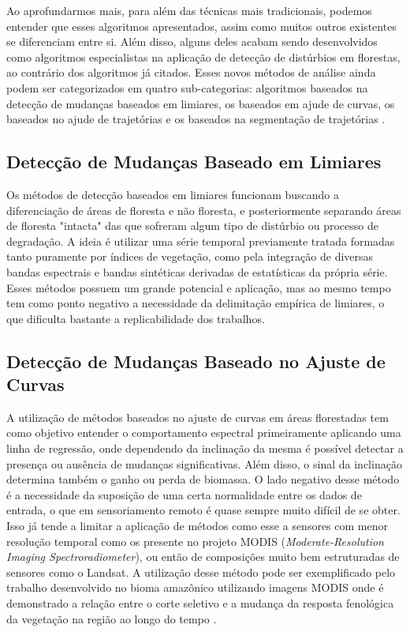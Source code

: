 \documentclass[12pt,a4paper]{article}
\begin{document}
Ao aprofundarmos mais, para além das técnicas mais tradicionais, podemos entender que esses algoritmos apresentados, assim como muitos outros existentes se diferenciam entre si. Além disso, alguns deles acabam sendo desenvolvidos como algoritmos especialistas na aplicação de detecção de distúrbios em florestas, ao contrário dos algoritmos já citados. Esses novos métodos de análise ainda podem ser categorizados em quatro sub-categorias: algoritmos baseados na detecção de mudanças baseados em limiares, os baseados em ajude de curvas, os baseados no ajude de trajetórias e os baseados na segmentação de trajetórias \citep{Banskota2014, Hirschmugl2017}.

\subsection{Detecção de Mudanças Baseado em Limiares}
\hspace{13pt} Os métodos de detecção baseados em limiares funcionam buscando a diferenciação de áreas de floresta e não floresta, e posteriormente separando áreas de floresta "intacta" das que sofreram algum tipo de distúrbio ou processo de degradação. A ideia é utilizar uma série temporal previamente tratada formadas tanto puramente por índices de vegetação, como pela integração de diversas bandas espectrais e bandas sintéticas derivadas de estatísticas da própria série. Esses métodos possuem um grande potencial e aplicação, mas ao mesmo tempo tem como ponto negativo a necessidade da delimitação empírica de limiares, o que dificulta bastante a replicabilidade dos trabalhos.

\subsection{Detecção de Mudanças Baseado no Ajuste de Curvas}
\hspace{13pt} A utilização de métodos baseados no ajuste de curvas em áreas florestadas tem como objetivo entender o comportamento espectral primeiramente aplicando uma linha de regressão, onde dependendo da inclinação da mesma é possível detectar a presença ou ausência de mudanças significativas. Além disso, o sinal da inclinação determina também o ganho ou perda de biomassa. O lado negativo desse método é a necessidade da suposição de uma certa normalidade entre os dados de entrada, o que em sensoriamento remoto é quase sempre muito difícil de se obter. Isso já tende a limitar a aplicação de métodos como esse a sensores com menor resolução temporal como os presente no projeto MODIS (\textit{Moderate-Resolution Imaging Spectroradiometer}), ou então de composições muito bem estruturadas de sensores como o Landsat. A utilização desse método pode ser exemplificado pelo trabalho desenvolvido no bioma amazônico utilizando imagens MODIS onde é demonstrado a relação entre o corte seletivo e a mudança da resposta fenológica da vegetação na região ao longo do tempo \citep{KOLTUNOV20092431}.
\end{document}
